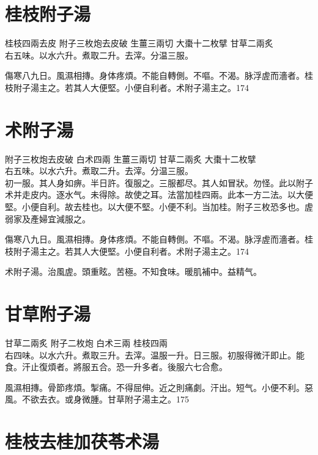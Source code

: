 \section{桂枝附子湯}

桂枝{\scriptsize 四兩去皮} 附子{\scriptsize 三枚炮去皮破} 生薑{\scriptsize 三兩切} 大棗{\scriptsize 十二枚擘} 甘草{\scriptsize 二兩炙}\\
右五味。以水六升。煮取二升。去滓。分温三服。

傷寒八九日。風濕相摶。身体疼煩。不能自轉側。不嘔。不渴。脉浮虗而濇者。桂枝附子湯主之。若其人大便堅。小便自利者。术附子湯主之。174

\section{术附子湯}

附子{\scriptsize 三枚炮去皮破} 白术{\scriptsize 四兩} 生薑{\scriptsize 三兩切} 甘草{\scriptsize 二兩炙} 大棗{\scriptsize 十二枚擘}\\
右五味。以水六升。煮取二升。去滓。分温三服。\\
初一服。其人身如痹。半日許。復服之。三服都尽。其人如冒狀。勿怪。此以附子术并走皮内。逐水气。未得除。故使之耳。法當加桂四兩。此本一方二法。以大便堅。小便自利。故去桂也。以大便不堅。小便不利。当加桂。附子三枚恐多也。虗弱家及產婦宜減服之。

傷寒八九日。風濕相摶。身体疼煩。不能自轉側。不嘔。不渴。脉浮虗而濇者。桂枝附子湯主之。若其人大便堅。小便自利者。术附子湯主之。174

术附子湯。治風虗。頭重眩。苦極。不知食味。暖肌補中。益精气。


\section{甘草附子湯}

甘草{\scriptsize 二兩炙} 附子{\scriptsize 二枚炮} 白术{\scriptsize 三兩} 桂枝{\scriptsize 四兩}\\ 
右四味。以水六升。煮取三升。去滓。温服一升。日三服。初服得微汗即止。能食。汗止復煩者。將服五合。恐一升多者。後服六七合愈。

風濕相摶。骨節疼煩。掣痛。不得屈伸。近之則痛劇。汗出。短气。小便不利。惡風。不欲去衣。或身微腫。甘草附子湯主之。175

\section{桂枝去桂加茯苓术湯}

